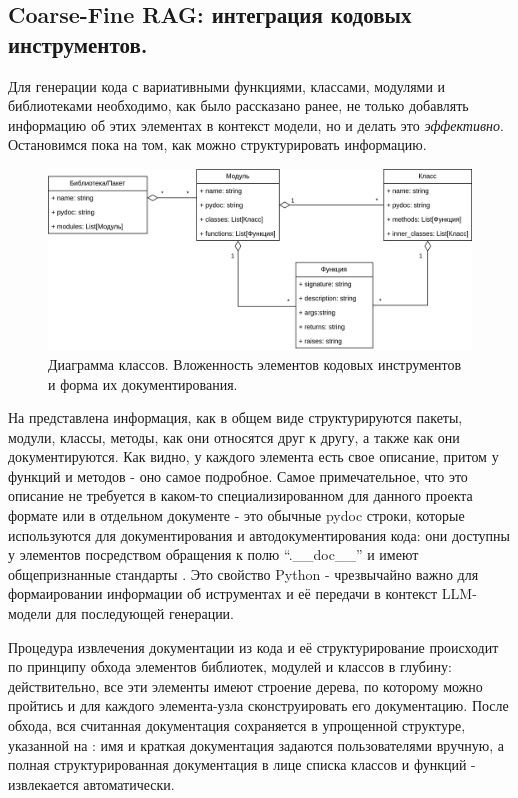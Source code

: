 \subsection{Coarse-Fine RAG: интеграция кодовых инструментов.} \label{ch3:sec1:subsec1}

Для генерации кода с вариативными функциями, классами, модулями и библиотеками необходимо, 
как было рассказано ранее, не только добавлять информацию об этих элементах в контекст 
модели, но и делать это \textit{эффективно}. 
Остановимся пока на том, как можно структурировать информацию.

\begin{figure}
    \center
	\includegraphics[scale=0.16]{sources/документирование pydoc.drawio.png}
	\caption{Диаграмма классов. Вложенность элементов кодовых инструментов
 и форма их документирования.} 
	\label{fig:ch3:code_tools}  
\end{figure}

На  представлена информация, как в общем виде
структурируются пакеты, модули, классы, методы, как они относятся друг к другу,
а также как они документируются. 
Как видно, у каждого элемента есть свое описание, притом у функций и методов - 
оно самое подробное. 
Самое примечательное, что это описание не требуется в каком-то 
специализированном для данного проекта формате или в отдельном документе - 
это обычные pydoc строки, которые используются для документирования и автодокументирования
кода: они доступны у элементов посредством обращения к полю ``.\_\_doc\_\_'' и имеют 
общепризнанные стандарты \cite{google_pydoc}. 
Это свойство Python - чрезвычайно важно для формаировании информации об
иструментах и её передачи в контекст LLM-модели для последующей генерации.

Процедура извлечения документации из кода и её структурирование происходит 
по принципу обхода элементов библиотек, модулей и классов в глубину: 
действительно, все эти элементы имеют строение дерева,
по которому можно пройтись и для каждого элемента-узла сконструировать его документацию.
После обхода, вся считанная документация сохраняется в упрощенной структуре, указанной
на : имя и краткая документация задаются пользователями вручную, а полная
структурированная документация в лице списка классов и функций - извлекается автоматически. 


